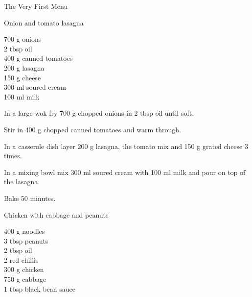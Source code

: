 \begin{menu}{The Very First Menu}
\begin{recipe}{2}{Onion and tomato lasagna}
		\begin{ingredients}
		700 g onions  \\
	2 tbsp oil  \\
	400 g canned tomatoes  \\
	200 g lasagna  \\
	150 g cheese  \\
	300 ml soured cream  \\
	100 ml milk  \\
	
		\end{ingredients}
	
    \begin{instructions}
    \item 
        In a large wok fry
        700 g chopped onions
        in
        2 tbsp  oil
        until soft.
      \item 
        Stir in 400 g chopped canned tomatoes
        and warm through.
      \item 
        In a casserole dish layer
        200 g  lasagna,
        the tomato mix and
        150 g grated cheese
        3 times.
      \item 
        In a mixing bowl mix
        300 ml  soured cream
        with
        100 ml  milk
        and pour on top of the lasagna.
      \item 
        Bake  50 minutes.
      
    \end{instructions}
    \end{recipe}%
  
    \begin{recipe}{2}{Chicken with cabbage and peanuts}%
    
		\begin{ingredients}
		400 g noodles  \\
	3 tbsp peanuts  \\
	2 tbsp oil  \\
	2  red chillis  \\
	300 g chicken  \\
	750 g cabbage  \\
	1 tbsp black bean sauce  \\
	
		\end{ingredients}
	

\end{recipe}
\end{menu}
